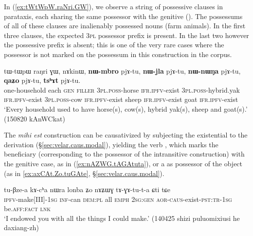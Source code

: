 In (\ref{ex:tWtWpW.raNri.GW}), we observe a string of possessive clauses in parataxis, each sharing the same possessor with the genitive (). The possessums of all of these clauses are inalienably possessed nouns (farm animals). In the first three clauses, the expected \textsc{3pl} possessor prefix is present. In the last two however the possessive prefix is absent; this is one of the very rare cases where the possessor is not marked on the possessum in this construction in the corpus.
 
 \begin{exe}
\ex \label{ex:tWtWpW.raNri.GW}
\gll tɯ-tɯpɯ raŋri ɣɯ, nɤkinɯ, \textbf{nɯ-mbro} pjɤ-tu, \textbf{nɯ-jla} pjɤ-tu, \textbf{nɯ-nɯŋa} pjɤ-tu, \textbf{qaʑo} pjɤ-tu, \textbf{tsʰɤt} pjɤ-tu. \\
one-household each \textsc{gen} \textsc{filler} \textsc{3pl}.\textsc{poss}-horse \textsc{ifr}.\textsc{ipfv}-exist 
\textsc{3pl}.\textsc{poss}-hybrid.yak \textsc{ifr}.\textsc{ipfv}-exist \textsc{3pl}.\textsc{poss}-cow \textsc{ifr}.\textsc{ipfv}-exist sheep  \textsc{ifr}.\textsc{ipfv}-exist  goat  \textsc{ifr}.\textsc{ipfv}-exist  \\
\glt `Every household used to have horse(s), cow(s), hybrid yak(s), sheep and goat(s).' (150820 kAnWCkat)
 \end{exe}
 
 The  \textit{mihi est} construction can be causativized by subjecting the existential  to the  derivation (§\ref{sec:velar.caus.modal}), yielding the verb , which marks the beneficiary (corresponding to the possessor of the intransitive construction) with the genitive case, as  in (\ref{ex:nAZWG.tAGAtuta}), or a as possessor of the object (as in \ref{ex:axCAt.Zo.tuGAte}, §\ref{sec:velar.caus.modal}).
 
 \begin{exe}
\ex \label{ex:nAZWG.tAGAtuta}
\gll tu-βze-a kɤ-cʰa nɯra lonba ʑo nɤʑɯɣ tɤ-ɣɤ-tu-t-a ɕti tɕe \\
\textsc{ipfv}-make[III]-\textsc{1sg} \textsc{inf}-can \textsc{dem}:\textsc{pl} all \textsc{emph} \textsc{2sg}:\textsc{gen} \textsc{aor}-\textsc{caus}-exist-\textsc{pst}:\textsc{tr}-\textsc{1sg} be.\textsc{aff}:\textsc{fact} \textsc{lnk} \\
\glt  `I endowed you with all the things I could make.' (140425 shizi puluomixiusi he daxiang-zh)
 \end{exe}
 
